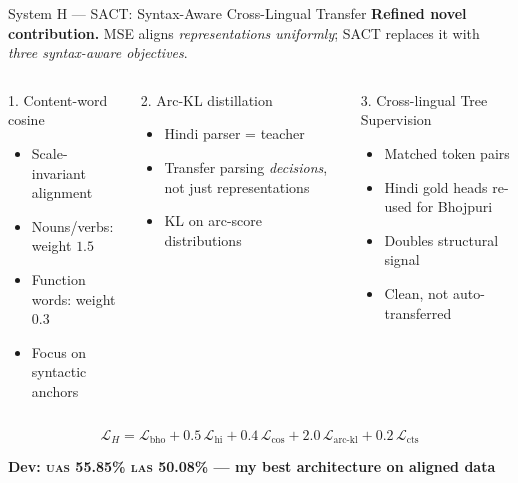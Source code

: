 \documentclass[aspectratio=169,10pt]{beamer}
\newcommand{\bho}{Bhojpuri}
\newcommand{\hi}{Hindi}
\newcommand{\uas}{\textsc{uas}}
\newcommand{\las}{\textsc{las}}
\begin{document}
\begin{frame}{System H --- SACT: Syntax-Aware Cross-Lingual Transfer}
\textbf{Refined novel contribution.} MSE aligns \emph{representations uniformly}; SACT replaces it with \emph{three syntax-aware objectives}.

\vspace{0.25cm}
\begin{columns}[T]
\begin{block}{1. Content-word cosine}
\begin{itemize}\small
  \item Scale-invariant alignment
  \item Nouns/verbs: weight $1.5$
  \item Function words: weight $0.3$
  \item Focus on syntactic anchors
\end{itemize}
\end{block}

\begin{block}{2. Arc-KL distillation}
\begin{itemize}\small
  \item \hi{} parser = teacher
  \item Transfer parsing \emph{decisions}, not just representations
  \item KL on arc-score distributions
\end{itemize}
\end{block}

\begin{block}{3. Cross-lingual Tree Supervision}
\begin{itemize}\small
  \item Matched token pairs
  \item \hi{} gold heads re-used for \bho{}
  \item Doubles structural signal
  \item Clean, not auto-transferred
\end{itemize}
\end{block}
\end{columns}

\vspace{0.3cm}
\begin{equation*}
\mathcal{L}_H = \mathcal{L}_{\text{bho}}
 + 0.5\,\mathcal{L}_{\text{hi}}
 + 0.4\,\mathcal{L}_{\text{cos}}
 + 2.0\,\mathcal{L}_{\text{arc-kl}}
 + 0.2\,\mathcal{L}_{\text{cts}}
\end{equation*}

\vspace{0.2cm}
\centering
\colorbox{comp1!18}{\textbf{Dev: \uas{} 55.85\% \quad \las{} 50.08\% \quad --- my best architecture on aligned data}}
\end{frame}
\end{document}
